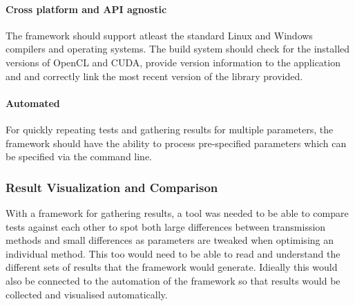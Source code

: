 \documentclass[12pt,a4paper]{article}
\begin{document}
\paragraph{Cross platform and API agnostic}
The framework should support atleast the standard Linux and Windows compilers and operating systems.  The build system should check for the installed versions of OpenCL and CUDA, provide version information to the application and and correctly link the most recent version of the library provided.
\paragraph{Automated}
For quickly repeating tests and gathering results for multiple parameters, the framework should have the ability to process pre-specified parameters which can be specified via the command line.
\subsubsection{Result Visualization and Comparison}
With a framework for gathering results, a tool was needed to be able to compare tests against each other to spot both large differences between transmission methods and small differences as parameters are tweaked when optimising an individual method. This too would need to be able to read and understand the different sets of results that the framework would generate. Idieally this would also be connected to the automation of the framework so that results would be collected and visualised automatically.




\end{document}
